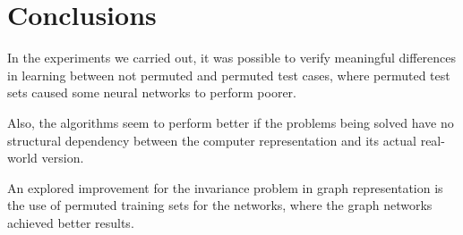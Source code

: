 \section{Conclusions}

In the experiments we carried out, it was possible to verify meaningful differences in learning between not permuted and permuted test cases, where permuted test sets caused some neural networks to perform poorer.

Also, the algorithms seem to perform better if the problems being solved have no structural dependency between the computer representation and its actual real-world version.

An explored improvement for the invariance problem in graph representation is the use of permuted training sets for the networks, where the graph networks achieved better results.